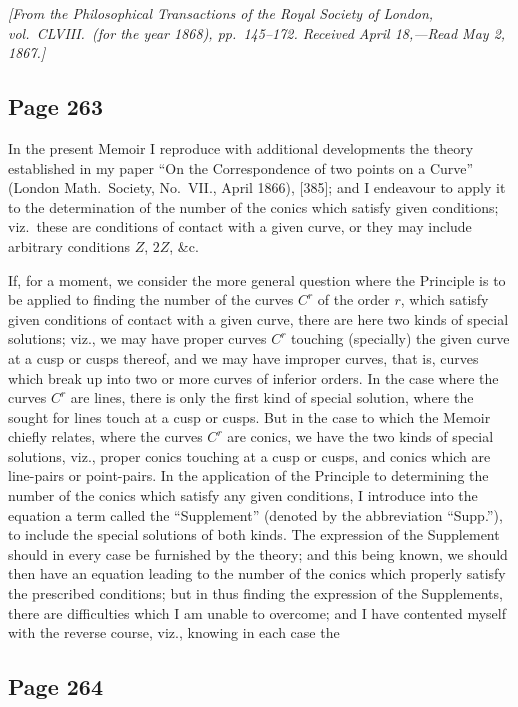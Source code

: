 \documentclass[11pt,a4paper]{article}
\theoremstyle{definition}
\begin{document}
\noindent\textit{[From the Philosophical Transactions of the Royal Society of London, vol.~CLVIII.\ (for the year 1868), pp.~145--172. Received April 18,---Read May 2, 1867.]}

\vspace{6pt}

\subsection*{Page 263}

In the present Memoir I reproduce with additional developments the theory established in my paper ``On the Correspondence of two points on a Curve'' (London Math.\ Society, No.~VII., April 1866), [385]; and I endeavour to apply it to the determination of the number of the conics which satisfy given conditions; viz.\ these are conditions of contact with a given curve, or they may include arbitrary conditions $Z$, $2Z$, \&c.

If, for a moment, we consider the more general question where the Principle is to be applied to finding the number of the curves $C^r$ of the order $r$, which satisfy given conditions of contact with a given curve, there are here two kinds of special solutions; viz., we may have proper curves $C^r$ touching (specially) the given curve at a cusp or cusps thereof, and we may have improper curves, that is, curves which break up into two or more curves of inferior orders. In the case where the curves $C^r$ are lines, there is only the first kind of special solution, where the sought for lines touch at a cusp or cusps. But in the case to which the Memoir chiefly relates, where the curves $C^r$ are conics, we have the two kinds of special solutions, viz., proper conics touching at a cusp or cusps, and conics which are line-pairs or point-pairs. In the application of the Principle to determining the number of the conics which satisfy any given conditions, I introduce into the equation a term called the ``Supplement'' (denoted by the abbreviation ``Supp.''), to include the special solutions of both kinds. The expression of the Supplement should in every case be furnished by the theory; and this being known, we should then have an equation leading to the number of the conics which properly satisfy the prescribed conditions; but in thus finding the expression of the Supplements, there are difficulties which I am unable to overcome; and I have contented myself with the reverse course, viz., knowing in each case the


\subsection*{Page 264}
\end{document}
